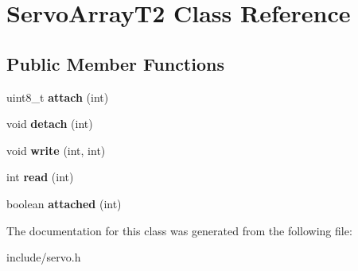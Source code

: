\hypertarget{classServoArrayT2}{}\section{Servo\+Array\+T2 Class Reference}
\label{classServoArrayT2}
\subsection*{Public Member Functions}
\begin{DoxyCompactItemize}
\item 
\mbox{\label{classServoArrayT2_a253109640012fa7d2ecf549c2cd673af}} 
uint8\+\_\+t {\bfseries attach} (int)
\item 
\mbox{\label{classServoArrayT2_aea4841446c85ce5f76c7814cd050dc7a}} 
void {\bfseries detach} (int)
\item 
\mbox{\label{classServoArrayT2_a1082f3b58ee53b64b87443eea66d7ca2}} 
void {\bfseries write} (int, int)
\item 
\mbox{\label{classServoArrayT2_a6d566f468798d09c601e1fd6be190a53}} 
int {\bfseries read} (int)
\item 
\mbox{\label{classServoArrayT2_a1da047d2234ef0bc213584d66a9b4e0b}} 
boolean {\bfseries attached} (int)
\end{DoxyCompactItemize}


The documentation for this class was generated from the following file\+:\begin{DoxyCompactItemize}
\item 
include/servo.\+h\end{DoxyCompactItemize}
